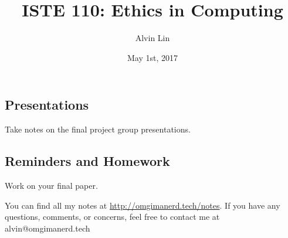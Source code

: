 \documentclass[letterpaper, 12pt]{article}
\title{ISTE 110: Ethics in Computing}
\author{Alvin Lin}
\date{May 1st, 2017}
\begin{document}
\maketitle

\subsection*{Presentations}
Take notes on the final project group presentations.

\subsection*{Reminders and Homework}
Work on your final paper.

\begin{center}
  You can find all my notes at \url{http://omgimanerd.tech/notes}. If you have
  any questions, comments, or concerns, feel free to contact me at
  alvin@omgimanerd.tech
\end{center}
\end{document}
